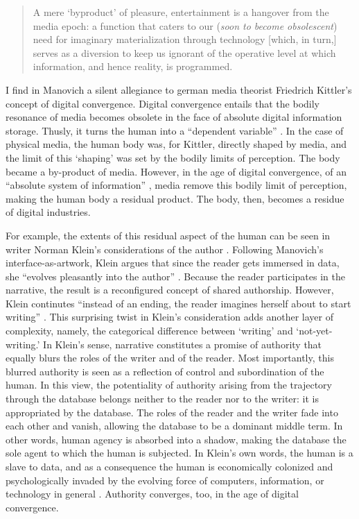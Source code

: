 \begin{quote}
	A mere `byproduct' of pleasure, entertainment is a hangover from the media epoch: a function that caters to our (\textit{soon to become obsolescent}) need for imaginary materialization through technology [which, in turn,] serves as a diversion to keep us ignorant of the operative level at which information, and hence reality, is programmed. \im \parencite[59]{Han02:Cin}
\end{quote}

I find in Manovich a silent allegiance to german media theorist Friedrich Kittler's concept of digital convergence. Digital convergence entails that the bodily resonance of media becomes obsolete in the face of absolute digital information storage. Thusly, it turns the human into a ``dependent variable'' \parencite[59]{Han02:Cin}. In the case of physical media, the human body was, for Kittler, directly shaped by media, and the limit of this `shaping' was set by the bodily limits of perception. The body became a by-product of media. However, in the age of digital convergence, of an ``absolute system of information'' \parencite[63]{Han02:Cin}, media remove this bodily limit of perception, making the human body a residual product. The body, then, becomes a residue of digital industries.

For example, the extents of this residual aspect of the human can be seen in writer Norman Klein's considerations of the author \parencite{Kle07:Wai}. Following Manovich's interface-as-artwork, Klein argues that since the reader gets immersed in data, she ``evolves pleasantly into the author'' \parencite[93]{Kle07:Wai}. Because the reader participates in the narrative, the result is a reconfigured concept of shared authorship. However, Klein continutes ``instead of an ending, the reader imagines herself about to start writing'' \parencite[93]{Kle07:Wai}. This surprising twist in Klein's consideration adds another layer of complexity, namely, the categorical difference between `writing' and `not-yet-writing.' In Klein's sense, narrative constitutes a promise of authority that equally blurs the roles of the writer and of the reader. Most importantly, this blurred authority is seen as a reflection of control and subordination of the human. In this view, the potentiality of authority arising from the trajectory through the database belongs neither to the reader nor to the writer: it is appropriated by the database. The roles of the reader and the writer fade into each other and vanish, allowing the database to be a dominant middle term. In other words, human agency is absorbed into a shadow, making the database the sole agent to which the human is subjected. In Klein's own words, the human is a slave to data, and as a consequence the human is economically colonized and psychologically invaded by the evolving force of computers, information, or technology in general \parencite[86-8]{Kle07:Wai}. Authority converges, too, in the age of digital convergence.

